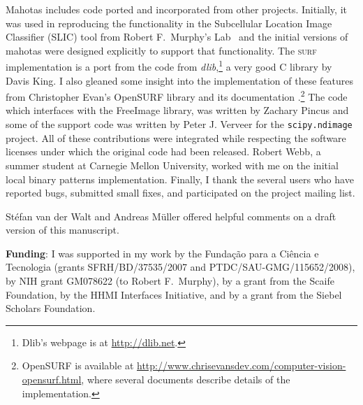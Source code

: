 \documentclass{scrartcl}
\newcommand*{\cpp}{{C\nolinebreak[4]\hspace{-.05em}\raisebox{.4ex}{\tiny\textbf{++}}}}
\let\code\texttt
\begin{document}
Mahotas includes code ported and incorporated from other projects. Initially,
it was used in reproducing the functionality in the Subcellular Location Image
Classifier (SLIC) tool from Robert F.\ Murphy's
Lab~\citep{springerlink:10.1007/978-0-387-45524-2_47} and the initial versions
of mahotas were designed explicitly to support that functionality. The
\textsc{surf} implementation is a port from the code from
\textit{dlib},\footnote{Dlib's webpage is at \url{http://dlib.net}.} a very
good \cpp{} library by Davis King. I also gleaned some insight into the
implementation of these features from Christopher Evan's OpenSURF library and
its documentation \citep{evans2009}.\footnote{OpenSURF is available at
\url{http://www.chrisevansdev.com/computer-vision-opensurf.html}, where several
documents describe details of the implementation.} The code which interfaces
with the FreeImage library, was written by Zachary Pincus and some of the
support code was written by Peter J. Verveer for the \code{scipy.ndimage}
project. All of these contributions were integrated while respecting the
software licenses under which the original code had been released. Robert Webb,
a summer student at Carnegie Mellon University, worked with me on the initial
local binary patterns implementation. Finally, I thank the several users who
have reported bugs, submitted small fixes, and participated on the project
mailing list.

Stéfan van der Walt and Andreas Müller offered helpful comments on a draft
version of this manuscript.

\textbf{Funding}: I was supported in my work by the Funda\c c\~{a}o para a
Ci\^encia e Tecnologia (grants SFRH/BD/37535/2007 and
PTDC/SAU-GMG/115652/2008), by NIH grant GM078622 (to Robert F.\ Murphy), by a
grant from the Scaife Foundation, by the HHMI Interfaces Initiative, and by a
grant from the Siebel Scholars Foundation.


\end{document}
